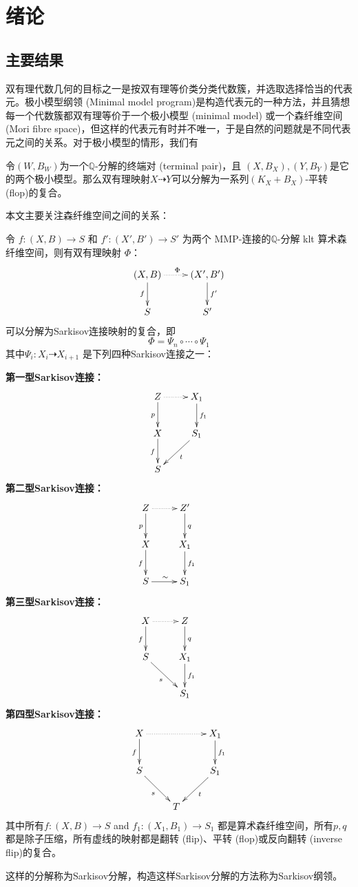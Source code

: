 \chapter{绪论}
\section{主要结果}
双有理代数几何的目标之一是按双有理等价类分类代数簇，并选取选择恰当的代表元。极小模型纲领 (Minimal model program)是构造代表元的一种方法，并且猜想每一个代数簇都双有理等价于一个极小模型 (minimal model) 或一个森纤维空间 (Mori fibre space)，但这样的代表元有时并不唯一，于是自然的问题就是不同代表元之间的关系。对于极小模型的情形，我们有
\begin{theorem}[平转连接极小模型]
	令$(W,B_{W})$为一个$\mathbb{Q}$-分解的终端对 (terminal pair)，且 $(X,B_{X}), (Y,B_{Y})$是它的两个极小模型。那么双有理映射$X \dashrightarrow Y$可以分解为一系列$(K_{X}+B_{X})$-平转 (flop)的复合。
\end{theorem}

本文主要关注森纤维空间之间的关系：
\begin{theorem}[Sarkisov分解]\label{main}
	令 $ f:(X, B)\to S$ 和 $f':(X', B')\to S' $ 为两个 MMP-连接的$ \mathbb{Q} $-分解 klt 算术森纤维空间，则有双有理映射 $\Phi$：
	\[ \xymatrix{
			(X,B)\ar[d]_{f}\ar@{.>}[r]^\Phi & (X',B')\ar[d]^{f'}\\
			S & S'} \]
	可以分解为Sarkisov连接映射的复合，即
	\[ \Phi=\Psi_{n}\circ \cdots \circ \Psi_{1} \]
	其中$\Psi_{i}:X_{i}\dashrightarrow X_{i+1} $ 是下列四种Sarkisov连接之一：

  \textbf{第一型Sarkisov连接：}
  \[\xymatrix{
			Z\ar[d]_{p}\ar@{.>}[r]&X_{1}\ar[d]^{f_1}\\
			X\ar[d]_{f}&S_1\ar[dl]^{t}\\
  S &}\]
  \textbf{第二型Sarkisov连接：}
  \[\xymatrix{
			Z\ar[d]_{p}\ar@{.>}[r]&Z'\ar[d]^{q}&\\
			X\ar[d]_{f}&X_1\ar[d]^{f_1}\\
  S\ar[r]^{\sim}&S_1}\]
  \textbf{第三型Sarkisov连接：}
\[ \xymatrix{
		X\ar@{.>}[r]\ar[d]_{f}& Z\ar[d]^q& \\
		S\ar[rd]_{s}         & X_{1}\ar[d]^{f_{1}}&\\
		&S_{1}
		} \]
  \textbf{第四型Sarkisov连接：}
\[ \xymatrix{
			X \ar[d]_f\ar@{.>}[rr]&&X_{1}\ar[d]^{f_1}\\
			S \ar[dr]_{s}&&S_{1} \ar[dl]^{t}\\
			&T &} \]
	其中所有$ f:(X, B)\to S $ and $ f_1:(X_1, B_1)\to S_1 $ 都是算术森纤维空间，所有$p,q$ 都是除子压缩，所有虚线的映射都是翻转 (flip)、平转 (flop)或反向翻转 (inverse flip)的复合。
\end{theorem}
这样的分解称为Sarkisov分解，构造这样Sarkisov分解的方法称为Sarkisov纲领。

